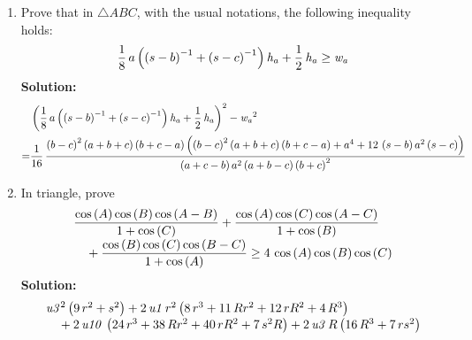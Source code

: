 \documentclass{report}
\begin{document}
\begin{enumerate}
	
	
	
	
	
	
	
	
	
	
	
	
	
	
	
	
	
	
	
	
	
	
	
	
	
	
	
	
	
	
	
	
	
	
	\item Prove that in $\triangle ABC$, with the usual notations, the following inequality holds:$$\frac{1}{8}\,a \left( \left( s-b \right) ^{-1}+ \left( s-c \right) ^{-1}\right) {\it h_a}+\frac{1}{2}\,{\it h_a}\geq {\it w_a}$$
	\textbf{Solution:} \begin{align*}
	& \left( \frac{1}{8}\,a \left( \left( s-b \right) ^{-1}+ \left( s-c \right) ^{-1} \right) {\it h_a}+\frac{1}{2}\,{\it h_a} \right) ^{2}-{{\it w_a}}^{2}\\
	= & \frac{1}{16}\,{\frac { \left( b-c \right) ^{2} \left( a+b+c \right) \left( b+c-a\right) \left( \left( b-c \right) ^{2} \left( a+b+c \right)\left( b+c-a \right) +{a}^{4}+12\, \left( s-b \right) {a}^{2} \left(s-c \right) \right) }{ \left( a+c-b \right) {a}^{2} \left( a+b-c\right) \left( b+c \right) ^{2}}}
	\end{align*} 
	\item In triangle, prove$$\splitfrac{{\dfrac{\cos \left( A \right) \cos \left( B \right) \cos \left( A-B\right) }{1+\cos \left( C \right) }}+{\dfrac {\cos \left( A \right)\cos \left( C \right) \cos \left( A-C \right) }{1+\cos \left( B\right) }}}{+{\dfrac {\cos \left( B \right) \cos \left( C \right) \cos\left( B-C \right) }{1+\cos \left( A \right) }}\geq 4\,\cos \left( A \right) \cos \left( B \right) \cos \left( C \right) }$$
	\textbf{Solution:} $$\splitfrac{{{\it u3}}^{2} \left( 9\,{r}^{2}+{s}^{2} \right) +2\,{\it u1}\,{r}^{2}\left( 8\,{r}^{3}+11\,R{r}^{2}+12\,r{R}^{2}+4\,{R}^{3} \right) }{+2\,{\it u10}\, \left(24\,{r}^{3}+38\,R{r}^{2}+40\,r{R}^{2}+7\,{s}^{2}R\right) +2\,{\it u3}\,R \left( 16\,{R}^{3}+7\,r{s}^{2} \right) }$$
	\begin{flushright}
	\end{flushright}

\end{enumerate}
\end{document}
